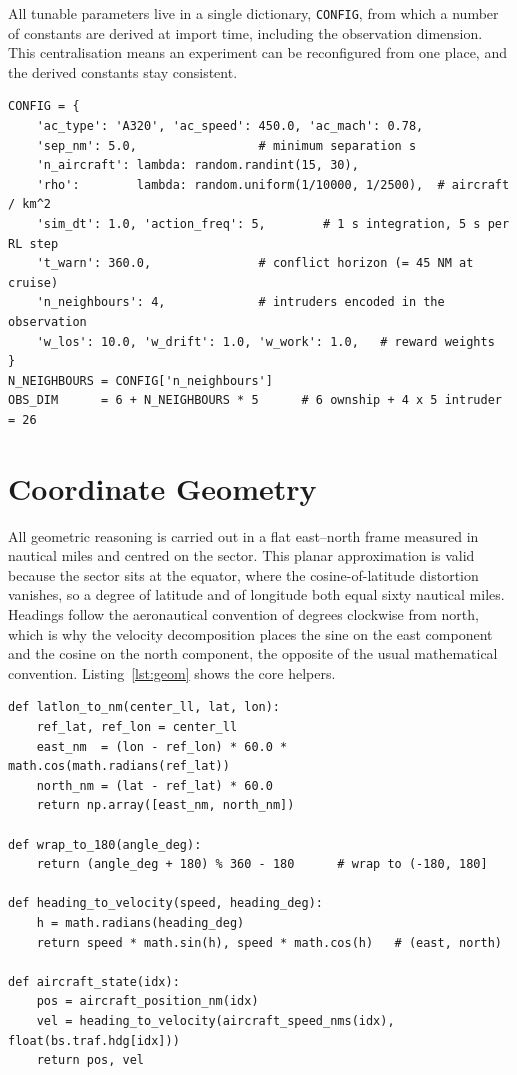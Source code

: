 All tunable parameters live in a single dictionary, \texttt{CONFIG}, from which a number of constants are derived at import time, including the observation dimension. This centralisation means an experiment can be reconfigured from one place, and the derived constants stay consistent.

\begin{lstlisting}[caption={Selected entries of the \texttt{CONFIG} dictionary and derived constants (\texttt{config.py}).}, label={lst:config}]
CONFIG = {
    'ac_type': 'A320', 'ac_speed': 450.0, 'ac_mach': 0.78,
    'sep_nm': 5.0,                 # minimum separation s
    'n_aircraft': lambda: random.randint(15, 30),
    'rho':        lambda: random.uniform(1/10000, 1/2500),  # aircraft / km^2
    'sim_dt': 1.0, 'action_freq': 5,        # 1 s integration, 5 s per RL step
    't_warn': 360.0,               # conflict horizon (= 45 NM at cruise)
    'n_neighbours': 4,             # intruders encoded in the observation
    'w_los': 10.0, 'w_drift': 1.0, 'w_work': 1.0,   # reward weights
}
N_NEIGHBOURS = CONFIG['n_neighbours']
OBS_DIM      = 6 + N_NEIGHBOURS * 5      # 6 ownship + 4 x 5 intruder = 26
\end{lstlisting}


\section{Coordinate Geometry}
\label{sec:method_geom}

All geometric reasoning is carried out in a flat east--north frame measured in nautical miles and centred on the sector. This planar approximation is valid because the sector sits at the equator, where the cosine-of-latitude distortion vanishes, so a degree of latitude and of longitude both equal sixty nautical miles. Headings follow the aeronautical convention of degrees clockwise from north, which is why the velocity decomposition places the sine on the east component and the cosine on the north component, the opposite of the usual mathematical convention. Listing~\ref{lst:geom} shows the core helpers.

\begin{lstlisting}[caption={Frame transforms and state readers (\texttt{geometry.py}).}, label={lst:geom}]
def latlon_to_nm(center_ll, lat, lon):
    ref_lat, ref_lon = center_ll
    east_nm  = (lon - ref_lon) * 60.0 * math.cos(math.radians(ref_lat))
    north_nm = (lat - ref_lat) * 60.0
    return np.array([east_nm, north_nm])

def wrap_to_180(angle_deg):
    return (angle_deg + 180) % 360 - 180      # wrap to (-180, 180]

def heading_to_velocity(speed, heading_deg):
    h = math.radians(heading_deg)
    return speed * math.sin(h), speed * math.cos(h)   # (east, north)

def aircraft_state(idx):
    pos = aircraft_position_nm(idx)
    vel = heading_to_velocity(aircraft_speed_nms(idx), float(bs.traf.hdg[idx]))
    return pos, vel
\end{lstlisting}

